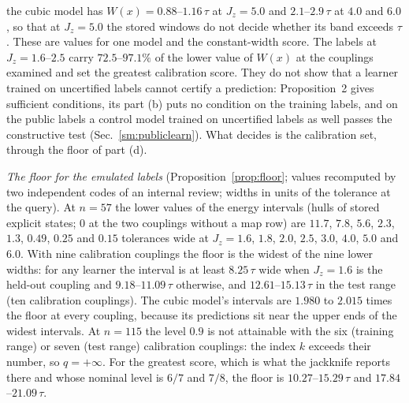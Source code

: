 \documentclass[aps,prx,onecolumn,10pt,nofootinbib,longbibliography,floatfix]{revtex4-2}
\theoremstyle{remark}
\newcommand{\Jz}{J_z}
\begin{document}
the cubic model has $W(x)=0.88$--$1.16\,\tau$ at $\Jz=5.0$ and $2.1$--$2.9\,\tau$ at $4.0$ and $6.0$, so that at %
$\Jz=5.0$ the stored windows do not decide whether its band exceeds $\tau$. %
These are values for one model and the constant-width score. The labels at $\Jz=1.6$--$2.5$ carry
$72.5$--$97.1\%$ of the lower value of $W(x)$ at the couplings examined and set the greatest calibration score. %
They do not show that a learner trained on uncertified labels cannot certify a prediction: Proposition~2 gives %
sufficient conditions, its part (b) puts no condition on the training labels, and on the public labels a control
model trained on uncertified labels as well passes the constructive test (Sec.~\ref{sm:publiclearn}). What decides
is the calibration set, through the floor of part (d).

\emph{The floor for the emulated labels} (Proposition~\ref{prop:floor}; values recomputed by two independent codes
of an internal review; widths in units of the tolerance at the query). At $n=57$ the lower values of the energy %
intervals (hulls of stored explicit states; $0$ at the two couplings without a map row) are $11.7$, $7.8$, $5.6$, %
$2.3$, $1.3$, $0.49$, $0.25$ and $0.15$ tolerances wide at $\Jz=1.6$, $1.8$, $2.0$, $2.5$, $3.0$, $4.0$, $5.0$ and %
$6.0$. With nine calibration couplings the floor is the widest of the nine lower widths: for any learner the %
interval is at least $8.25\,\tau$ wide when $\Jz=1.6$ is the held-out coupling and $9.18$--$11.09\,\tau$ otherwise, %
and $12.61$--$15.13\,\tau$ in the test range (ten calibration couplings). The cubic model's intervals are $1.980$ %
to $2.015$ times the floor at every coupling, because its predictions sit near the upper ends of the widest %
intervals. At $n=115$ the level $0.9$ is not attainable with the six (training range) or seven (test range) %
calibration couplings: the index $k$ exceeds their number, so $q=+\infty$. For the greatest score, which is what the
jackknife reports there and whose nominal level is $6/7$ and $7/8$, the floor is $10.27$--$15.29\,\tau$ and %
$17.84$--$21.09\,\tau$. %
\end{document}
